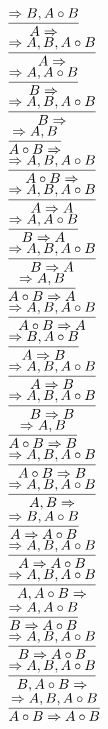 \documentclass[11pt]{article}
\begin{document}
\begin{center}

$\infer{A\Rightarrow }{\Rightarrow B, A\circ B}$
\bigskip
\\$\infer{A\Rightarrow }{\Rightarrow A, B, A\circ B}$
\bigskip
\\$\infer{B\Rightarrow }{\Rightarrow A, A\circ B}$
\bigskip
\\$\infer{B\Rightarrow }{\Rightarrow A, B, A\circ B}$
\bigskip
\\$\infer{A\circ B\Rightarrow }{\Rightarrow A, B}$
\bigskip
\\$\infer{A\circ B\Rightarrow }{\Rightarrow A, B, A\circ B}$
\bigskip
\\$\infer{A\Rightarrow A}{\Rightarrow A, B, A\circ B}$
\bigskip
\\$\infer{B\Rightarrow A}{\Rightarrow A, A\circ B}$
\bigskip
\\$\infer{B\Rightarrow A}{\Rightarrow A, B, A\circ B}$
\bigskip
\\$\infer{A\circ B\Rightarrow A}{\Rightarrow A, B}$
\bigskip
\\$\infer{A\circ B\Rightarrow A}{\Rightarrow A, B, A\circ B}$
\bigskip
\\$\infer{A\Rightarrow B}{\Rightarrow B, A\circ B}$
\bigskip
\\$\infer{A\Rightarrow B}{\Rightarrow A, B, A\circ B}$
\bigskip
\\$\infer{B\Rightarrow B}{\Rightarrow A, B, A\circ B}$
\bigskip
\\$\infer{A\circ B\Rightarrow B}{\Rightarrow A, B}$
\bigskip
\\$\infer{A\circ B\Rightarrow B}{\Rightarrow A, B, A\circ B}$
\bigskip
\\$\infer{A, B\Rightarrow }{\Rightarrow A, B, A\circ B}$
\bigskip
\\$\infer{A\Rightarrow A\circ B}{\Rightarrow B, A\circ B}$
\bigskip
\\$\infer{A\Rightarrow A\circ B}{\Rightarrow A, B, A\circ B}$
\bigskip
\\$\infer{A, A\circ B\Rightarrow }{\Rightarrow A, B, A\circ B}$
\bigskip
\\$\infer{B\Rightarrow A\circ B}{\Rightarrow A, A\circ B}$
\bigskip
\\$\infer{B\Rightarrow A\circ B}{\Rightarrow A, B, A\circ B}$
\bigskip
\\$\infer{B, A\circ B\Rightarrow }{\Rightarrow A, B, A\circ B}$
\bigskip
\\$\infer{A\circ B\Rightarrow A\circ B}{\Rightarrow A, B, A\circ B}$
\bigskip

\end{center}
\end{document}
